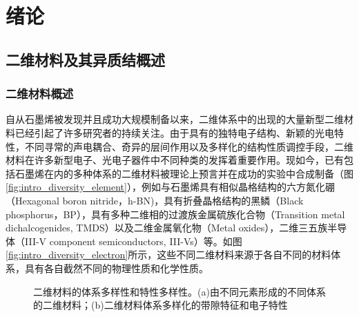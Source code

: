 \chapter{绪\hspace{12pt}论}
\section{二维材料及其异质结概述}
\subsection{二维材料概述}
    自从石墨烯被发现并且成功大规模制备以来，二维体系中的出现的大量新型二维材料已经引起了许多研究者的持续关注。由于具有的独特电子结构、新颖的光电特性，不同寻常的声电耦合、奇异的层间作用以及多样化的结构性质调控手段，二维材料在许多新型电子、光电子器件中不同种类的发挥着重要作用。现如今，已有包括石墨烯在内的多种体系的二维材料被理论上预言并在成功的实验中合成制备（图\ref{fig:intro_diversity_element}），例如与石墨烯具有相似晶格结构的六方氮化硼（Hexagonal boron nitride，h-BN)，具有折叠晶格结构的黑鳞（Black phosphorus，BP），具有多种二维相的过渡族金属硫族化合物（Transition metal dichalcogenides, TMDS）以及二维金属氧化物（Metal oxides），二维三五族半导体（III-V component semiconductors, III-Vs）等。如图\ref{fig:intro_diversity_electron}所示，这些不同二维材料来源于各自不同的材料体系，具有各自截然不同的物理性质和化学性质。
    \begin{figure}[!b]
        \label{fig:intro_diversity}
    \end{figure}
    \begin{figure}\ContinuedFloat
        \captionsetup{width=\textwidth}
        \caption{二维材料的体系多样性和特性多样性。(a)由不同元素形成的不同体系的二维材料；(b)二维材料体系多样化的带隙特征和电子特性}
    \end{figure}


